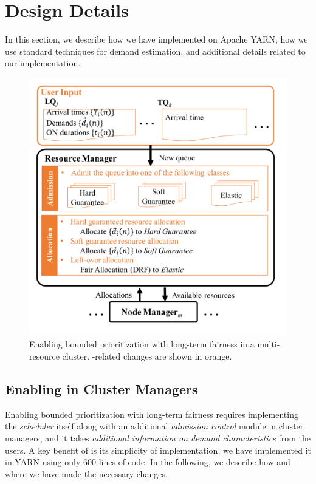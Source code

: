 \section{Design Details}
\label{sec:impl}

In this section, we describe how we have implemented \name on Apache YARN, how we use standard techniques for demand estimation, and additional details related to our implementation.

\begin{figure}
\centering
\includegraphics[width=1.0\linewidth]{fig/diagram}
\caption{Enabling bounded prioritization with long-term fairness in a  multi-resource cluster. 
\name-related changes are shown in orange. }
\label{fig:system_design}
\end{figure}

\subsection{Enabling \name in Cluster Managers}
Enabling bounded prioritization with long-term fairness requires implementing the \emph{\name scheduler} itself along with an additional \emph{admission control} module in cluster managers, and it takes \emph{additional information on demand characteristics} from the users. 
A key benefit of {\name} is its simplicity of implementation: we have implemented it in YARN using only $600$ lines of code.
In the following, we describe how and where we have made the necessary changes.

